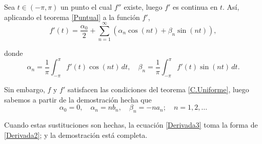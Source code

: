 \begin{demo}
Sea $t \in (-\pi,\pi)$ un punto el cual $f''$ existe, luego $f'$ es continua en $t$. Así, aplicando el teorema \ref{Puntual} a la función $f'$, 
\begin{equation}
    f'(t) = \frac{\alpha_0}{2} + \sum_{n=1}^{\infty} (\alpha_n \cos(nt) + \beta_n \sin(nt)), \label{Derivada3}
\end{equation}

donde 
$$\alpha_n = \frac{1}{\pi} \int_{-\pi}^{\pi} f'(t) \cos(nt) \,dt, \quad \beta_n = \frac{1}{\pi} \int_{-\pi}^{\pi} f'(t) \sin(nt) \,dt.$$

Sin embargo, $f$ y $f'$ satisfacen las condiciones del teorema \eqref{C.Uniforme}, luego sabemos a partir de la demostración hecha que 
\begin{equation*}
    \alpha_0 = 0, \quad \alpha_n = n b_n, \quad \beta_n = - na_n; \quad n = 1,2,\dots 
\end{equation*}

Cuando estas sustituciones son hechas, la ecuación \eqref{Derivada3} toma la forma de \eqref{Derivada2}; y la demostración está completa.
\end{demo}